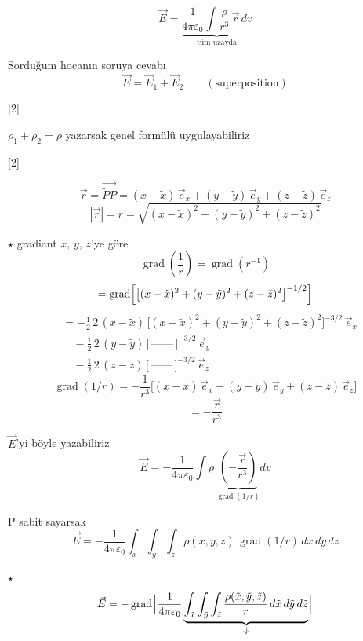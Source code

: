 \documentclass[11pt,a4paper]{article}
\begin{document}
\[ \vec E = \underbrace{\frac{1}{4\pi\varepsilon_0}\int\frac{\rho}{r^3}\,\vec r\,dv}_{\text{tüm uzayda}} \]

\medskip\noindent\hrulefill\medskip

\noindent Sorduğum hocanın soruya cevabı
\[ \vec E = \vec E_1 + \vec E_2 \qquad (\text{superposition}) \]

[2]

\noindent $\rho_1 + \rho_2 = \rho$ yazarsak genel formülü uygulayabiliriz

\medskip\noindent\hrulefill\medskip

[2]

\[ \vec r = \overrightarrow{\tilde P P} = (x-\tilde x)\,\vec e_x + (y-\tilde y)\,\vec e_y + (z-\tilde z)\,\vec e_z \]
\[ |\vec r| = r = \sqrt{(x-\tilde x)^2 + (y-\tilde y)^2 + (z-\tilde z)^2} \]

\noindent $\star$ gradiant $x,\,y,\,z$'ye göre
\[ \operatorname{grad}\!\left(\frac{1}{r}\right) = \operatorname{grad}\left(r^{-1}\right) \]
\[ = \operatorname{grad}\Bigl[\bigl[(x-\tilde x)^2+(y-\tilde y)^2+(z-\tilde z)^2\bigr]^{-1/2}\Bigr] \]
\begin{align*}
&= -\tfrac{1}{2}\,2\,(x-\tilde x)\,\bigl[(x-\tilde x)^2+(y-\tilde y)^2+(z-\tilde z)^2\bigr]^{-3/2}\,\vec e_x\\
&\quad -\tfrac{1}{2}\,2\,(y-\tilde y)\,\bigl[\,\text{------}\,\bigr]^{-3/2}\,\vec e_y\\
&\quad -\tfrac{1}{2}\,2\,(z-\tilde z)\,\bigl[\,\text{------}\,\bigr]^{-3/2}\,\vec e_z
\end{align*}
\[ \operatorname{grad}(1/r) = -\frac{1}{r^3}\bigl[(x-\tilde x)\,\vec e_x + (y-\tilde y)\,\vec e_y + (z-\tilde z)\,\vec e_z\bigr] \]
\[ = -\frac{\vec r}{r^3} \]

\noindent $\vec E$'yi böyle yazabiliriz
\[ \vec E = -\frac{1}{4\pi\varepsilon_0}\int \rho\,\underbrace{\left(-\frac{\vec r}{r^3}\right)}_{\operatorname{grad}(1/r)}dv \]

\noindent P sabit sayarsak
\[ \vec E = -\frac{1}{4\pi\varepsilon_0}\int_{\tilde x}\int_{\tilde y}\int_{\tilde z}\rho(\tilde x,\tilde y,\tilde z)\,\operatorname{grad}(1/r)\,d\tilde x\,d\tilde y\,d\tilde z \]

\noindent $\star$
\[ \vec E = -\operatorname{grad}\Bigl[\frac{1}{4\pi\varepsilon_0}\underbrace{\int_{\tilde x}\int_{\tilde y}\int_{\tilde z}\frac{\rho(\tilde x,\tilde y,\tilde z)}{r}\,d\tilde x\,d\tilde y\,d\tilde z}_{\Downarrow}\Bigr] \]
\end{document}
